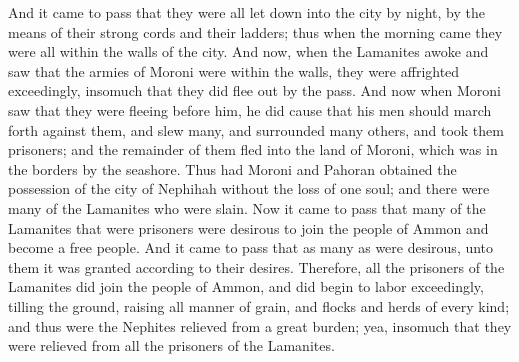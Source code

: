 And it came to pass that they were all let down into the city by night, by the means of their strong cords and their ladders; thus when the morning came they were all within the walls of the city.
\bverse \iffalse And now, when the Lamanites awoke and saw that the armies of Moroni were within the walls, they were affrighted exceedingly, insomuch that they did flee out by the pass. \fi
And now, when the Lamanites awoke and saw that the armies of Moroni were within the walls, they were affrighted exceedingly, insomuch that they did flee out by the pass.
\bverse \iffalse And now when Moroni saw that they were fleeing before him, he did cause that his men should march forth against them, and slew many, and surrounded many others, and took them prisoners; and the remainder of them fled into the land of Moroni, which was in the borders by the seashore. \fi
And now when Moroni saw that they were fleeing before him, he did cause that his men should march forth against them, and slew many, and surrounded many others, and took them prisoners; and the remainder of them fled into the land of Moroni, which was in the borders by the seashore.
\bverse \iffalse Thus had Moroni and Pahoran obtained the possession of the city of Nephihah without the loss of one soul; and there were many of the Lamanites who were slain. \fi
Thus had Moroni and Pahoran obtained the possession of the city of Nephihah without the loss of one soul; and there were many of the Lamanites who were slain.
\bverse \iffalse Now it came to pass that many of the Lamanites that were prisoners were desirous to join the people of Ammon and become a free people. \fi
Now it came to pass that many of the Lamanites that were prisoners were desirous to join the people of Ammon and become a free people.
\bverse \iffalse And it came to pass that as many as were desirous, unto them it was granted according to their desires. \fi
And it came to pass that as many as were desirous, unto them it was granted according to their desires.
\bverse \iffalse Therefore, all the prisoners of the Lamanites did join the people of Ammon, and did begin to labor exceedingly, tilling the ground, raising all manner of grain, and flocks and herds of every kind; and thus were the Nephites relieved from a great burden; yea, insomuch that they were relieved from all the prisoners of the Lamanites. \fi
Therefore, all the prisoners of the Lamanites did join the people of Ammon, and did begin to labor exceedingly, tilling the ground, raising all manner of grain, and flocks and herds of every kind; and thus were the Nephites relieved from a great burden; yea, insomuch that they were relieved from all the prisoners of the Lamanites.
